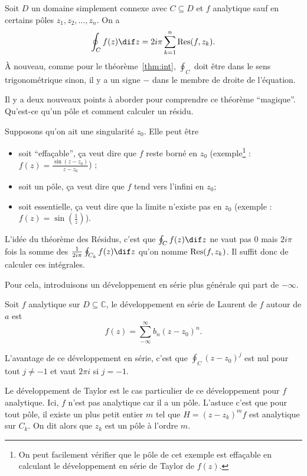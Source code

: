 \begin{mytheo}
  Soit $D$ un domaine simplement connexe avec
  $C \subseteq D$ et $f$ analytique
  sauf en certains pôles $z_1, z_2, \ldots, z_n$.
  On a
  \[ \oint_C f(z) \dif z = 2i\pi\sum_{k=1}^n \res(f, z_k). \]
  À nouveau,
  comme pour le théorème~\ref{thm:int},
  $\oint_C$ doit être dans le sens trigonométrique sinon,
  il y a un signe $-$ dans le membre de droite de l'équation.
\end{mytheo}

Il y a deux nouveaux points à aborder pour comprendre ce théorème
``magique''.
Qu'est-ce qu'un pôle et comment calculer un résidu.

Supposons qu'on ait une singularité $z_0$.
Elle peut être
\begin{itemize}
  \item soit ``effaçable'', ça veut dire que $f$ reste borné en $z_0$
	(exemple\footnote{On peut facilement vérifier que le pôle
	de cet exemple est effaçable en calculant le développement
	en série de Taylor de $f(z)$.} : $f(z) = \frac{\sin(z-z_0)}{z-z_0}$) ;
  \item soit un pôle, ça veut dire que $f$ tend vers l'infini en $z_0$;
  \item soit essentielle, ça veut dire que la limite n'existe pas en $z_0$
	(exemple : $f(z) = \sin(\frac{1}{z})$).
\end{itemize}

L'idée du théorème des Résidus, c'est que $\oint_C f(z) \dif z$ ne vaut
pas 0 mais $2i\pi$ fois la somme des
$\frac{1}{2i\pi} \oint_{C_k} f(z) \dif z$ qu'on
nomme $\operatorname{Res}(f, z_k)$.
Il suffit donc de calculer ces intégrales.

Pour cela, introduisons un développement en série plus générale qui
part de $-\infty$.
\begin{mydef}
  Soit $f$ analytique sur $D \subseteq \mathbb{C}$,
  le développement en série de Laurent de $f$ autour de $a$ est
  \[ f(z) = \sum_{-\infty}^{\infty}b_n(z-z_0)^n. \]
\end{mydef}
L'avantage de ce développement en série, c'est que
$\oint_C (z-z_0)^j$ est nul pour tout $j \neq -1$ et vaut $2\pi i$ si
$j = -1$.

Le développement de Taylor est le cas particulier de ce développement
pour $f$ analytique.
Ici, $f$ n'est pas analytique car il a un pôle.
L'astuce c'est que pour tout pôle, il existe un plus petit entier
$m$ tel que $H = (z-z_k)^mf$ est analytique sur $C_k$.
On dit alors que $z_k$ est un pôle à l'ordre $m$.

